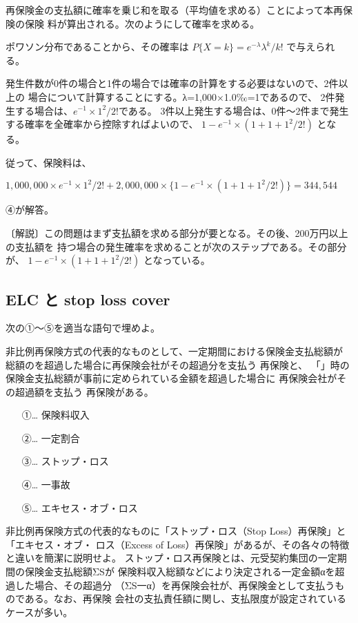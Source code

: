 \documentclass[report,gutter=10mm,fore-edge=10mm,uplatex,dvipdfmx]{jlreq}
\begin{document}
再保険金の支払額に確率を乗じ和を取る（平均値を求める）ことによって本再保険の保険
料が算出される。次のようにして確率を求める。

ポワソン分布であることから、その確率は
$P\{X=k\}=e^{-\lambda}\lambda^k/k!$ で与えられる。

発生件数が0件の場合と1件の場合では確率の計算をする必要はないので、2件以上の
場合について計算することにする。λ=1,000×1.0‰=1であるので、
2件発生する場合は、$e^{-1}\times 1^2/2!$である。
3件以上発生する場合は、0件〜2件まで発生する確率を全確率から控除すればよいので、
$1−e^{-1}\times(1+1+1^2/2!)$ となる。

従って、保険料は、

$1,000,000\times e^{-1} \times 1^2/2! + 2,000,000\times \{1-e^{-1}\times(1+1+1^2/2!)\} =344,544$

④が解答。

〔解説〕この問題はまず支払額を求める部分が要となる。その後、200万円以上の支払額を
持つ場合の発生確率を求めることが次のステップである。その部分が、
$1−e^{-1}\times(1+1+1^2/2!)$ 
となっている。

\subsection{ELC と stop loss cover}

次の①～⑤を適当な語句で埋めよ。

非比例再保険方式の代表的なものとして、一定期間における保険金支払総額が
総額のを超過した場合に再保険会社がその超過分を支払う
再保険と、
「」時の保険金支払総額が事前に定められている金額を超過した場合に
再保険会社がその超過額を支払う
再保険がある。
\answer{}
\begin{itemize}
\item[ ①… ] 保険料収入
\item[ ②… ] 一定割合
\item[ ③… ] ストップ・ロス
\item[ ④… ] 一事故
\item[ ⑤… ] エキセス・オブ・ロス
\end{itemize}

非比例再保険方式の代表的なものに「ストップ・ロス（Stop Loss）再保険」と「エキセス・オブ・
ロス（Excess of Loss）再保険」があるが、その各々の特徴と違いを簡潔に説明せよ。
\answer{}
ストップ・ロス再保険とは、元受契約集団の一定期間の保険金支払総額ΣSが
保険料収入総額などにより決定される一定金額αを超過した場合、その超過分
（ΣS一α）を再保険会社が、再保険金として支払うものである。なお、再保険
会社の支払責任額に関し、支払限度が設定されているケースが多い。
\end{document}
